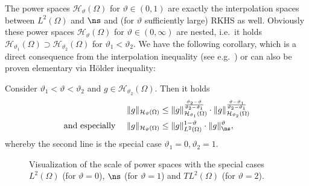 \documentclass[a4paper, 10pt]{article}
\newlength\fwidth
\newcommand{\Ht}{\mathcal{H}_{\vartheta}}
\begin{document}
The power spaces $\Ht(\Omega)$ for $\vartheta \in (0, 1)$ are exactly the interpolation spaces between $L^2(\Omega)$ and $\ns$ and (for $\vartheta$ sufficiently large) RKHS as well.
Obviously these power spaces $\Ht(\Omega)$ for $\vartheta \in (0, \infty)$ are nested, 
i.e.\ it holds $\mathcal{H}_{\vartheta_1}(\Omega) \supset \mathcal{H}_{\vartheta_2}(\Omega)$ for $\vartheta_1 < \vartheta_2$.
We have the following corollary, which is a direct consequence from the interpolation inequality (see e.g.\ \cite[Section 2.5]{lions2012non}) or can also be proven elementary via Hölder inequality:

\begin{cor}
\label{cor:hoelder_interpol}
Consider $\vartheta_1 < \vartheta < \vartheta_2$ and $g \in \mathcal{H}_{\vartheta_2}(\Omega)$.
Then it holds 
\begin{align}
\begin{aligned}
\label{eq:corr_hoelder}
\Vert g \Vert_{\mathcal{H}_{\vartheta}(\Omega)} &\leq \Vert g \Vert_{\mathcal{H}_{\vartheta_1}(\Omega)}^{\frac{\vartheta_2 - \vartheta}{\vartheta_2 - \vartheta_1}} \cdot \Vert g \Vert_{\mathcal{H}_{\vartheta_2}(\Omega)}^{\frac{\vartheta - \vartheta_1}{\vartheta_2 - \vartheta_1}} \\
\text{and especially \quad} \Vert g \Vert_{\mathcal{H}_{\vartheta}(\Omega)} &\leq \Vert g \Vert_{L^2(\Omega)}^{1 - \vartheta} \cdot \Vert g \Vert_{\ns}^{\vartheta},
\end{aligned}
\end{align}
whereby the second line is the special case $\vartheta_1 = 0, \vartheta_2 = 1$.
\end{cor}


\begin{figure}[t]
\label{fig:visualization}
\setlength{}

\caption{Visualization of the scale of power spaces with the special cases $L^2(\Omega)$ (for $\vartheta = 0$), $\ns$ (for $\vartheta = 1$) and $TL^2(\Omega)$ (for $\vartheta = 2$).}
\end{figure}
\end{document}
